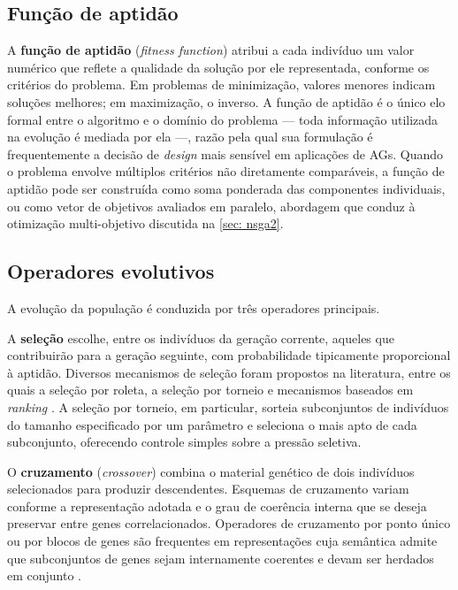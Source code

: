 \subsection{Função de aptidão}

A \textbf{função de aptidão} (\textit{fitness function}) atribui a cada indivíduo um valor numérico que reflete a qualidade da solução por ele representada, conforme os critérios do problema. Em problemas de minimização, valores menores indicam soluções melhores; em maximização, o inverso. A função de aptidão é o único elo formal entre o algoritmo e o domínio do problema --- toda informação utilizada na evolução é mediada por ela ---, razão pela qual sua formulação é frequentemente a decisão de \textit{design} mais sensível em aplicações de AGs. Quando o problema envolve múltiplos critérios não diretamente comparáveis, a função de aptidão pode ser construída como soma ponderada das componentes individuais, ou como vetor de objetivos avaliados em paralelo, abordagem que conduz à otimização multi-objetivo discutida na \autoref{sec: nsga2}.

\subsection{Operadores evolutivos}

A evolução da população é conduzida por três operadores principais.

A \textbf{seleção} escolhe, entre os indivíduos da geração corrente, aqueles que contribuirão para a geração seguinte, com probabilidade tipicamente proporcional à aptidão. Diversos mecanismos de seleção foram propostos na literatura, entre os quais a seleção por roleta, a seleção por torneio e mecanismos baseados em \textit{ranking} \cite{eiben2015introduction}. A seleção por torneio, em particular, sorteia subconjuntos de indivíduos do tamanho especificado por um parâmetro e seleciona o mais apto de cada subconjunto, oferecendo controle simples sobre a pressão seletiva.

O \textbf{cruzamento} (\textit{crossover}) combina o material genético de dois indivíduos selecionados para produzir descendentes. Esquemas de cruzamento variam conforme a representação adotada e o grau de coerência interna que se deseja preservar entre genes correlacionados. Operadores de cruzamento por ponto único ou por blocos de genes são frequentes em representações cuja semântica admite que subconjuntos de genes sejam internamente coerentes e devam ser herdados em conjunto \cite{mitchell1998introduction}.

